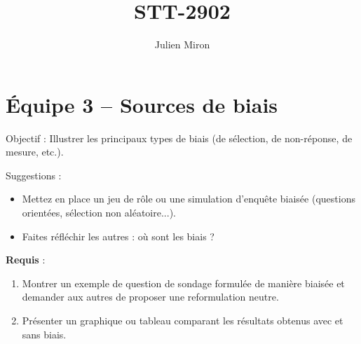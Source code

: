 \documentclass{article}
\title{STT-2902}
\author{Julien Miron}
\begin{document}
\section*{Équipe 3 – Sources de biais}

Objectif : Illustrer les principaux types de biais (de sélection, de non-réponse, de mesure, etc.).



\vspace{1cm}
Suggestions :
\begin{itemize}
    \item Mettez en place un jeu de rôle ou une simulation d’enquête biaisée (questions orientées, sélection non aléatoire...).
    \item Faites réfléchir les autres : où sont les biais ?

\end{itemize}


\vspace{1cm}
\textbf{Requis} :
\begin{enumerate}
    \item Montrer un exemple de question de sondage formulée de manière biaisée et demander aux autres de proposer une reformulation neutre.
    \item Présenter un graphique ou tableau comparant les résultats obtenus avec et sans biais.
\end{enumerate}
\end{document}
